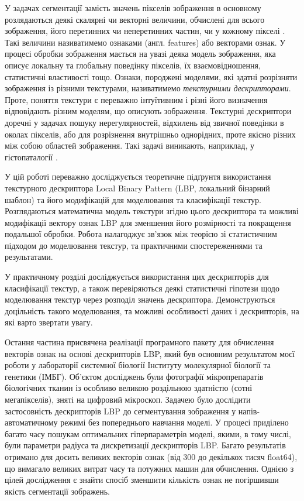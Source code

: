 У задачах сегментації замість значень пікселів зображення в основному розлядаються деякі скалярні чи векторні величини,
обчислені для всього зображення, його перетинних чи неперетинних частин, чи у кожному пікселі \cite{belsare2015, simon2018, esteva2017}. 
Такі величини називатимемо ознаками (англ. features) або векторами ознак.
У процесі обробки зображення мається на увазі деяка модель зображення, яка описує локальну та глобальну поведінку пікселів, їх взаємовідношення, статистичні властивості тощо.
Ознаки, породжені моделями, які здатні розрізняти зображення із різними текстурами, називатимемо \emph{текстурними дескрипторами}.
Проте, поняття текстури є переважно інтуїтивним і різні його визначення відповідають різним моделям, що описують зображення.  
Текстурні дескриптори доречні у задачах пошуку нерегулярностей, відхилень від звичної поведінки в околах пікселів, 
або для розрізнення внутрішньо однорідних, проте якісно різних між собою областей зображення. 
Такі задачі виникають, наприклад, у гістопаталогії \cite{simon2018}.

У цій роботі переважно досліджується теоретичне підґрунтя використання текстурного дескриптора Local Binary Pattern 
(LBP, локальний бінарний шаблон) \cite{ojala2002} та його модифікацій для моделювання та класифікації текстур.
Розглядаються математична модель текстури згідно цього дескриптора та можливі модифікації вектору ознак LBP для зменшення його розмірності та покращення подальшої обробки.
Робота налагоджує зв'язок між теорією зі статистичним підходом до моделювання текстур, та практичними спостереженнями та результатами.

У практичному розділі досліджується використання цих дескрипторів для класифікації текстур, 
а також перевіряються деякі статистичні гіпотези щодо моделювання текстур через розподіл значень дескриптора.
Демонструються доцільність такого моделювання, та можливі особливості даних і дескрипторів, на які варто звертати увагу.

Остання частина присвячена реалізації програмного пакету для обчислення векторів ознак на основі дескрипторів LBP, який був
основним результатом моєї роботи у лабораторії системної біології Інституту молекулярної біології та генетики (ІМБГ).
Об'єктом досліджень були фотографії мікропрепаратів біологічних тканин із особливо великою роздільною здатністю (сотні мегапікселів), зняті на цифровий мікроскоп.
Задачею було дослідити застосовність дескрипторів LBP до сегментування зображення у напів-автоматичному режимі без попереднього навчання моделі.
У процесі приділено багато часу пошукам оптимальних гіперпараметрів моделі, якими, в тому числі, були параметри радіуса та дискретизації дескрипторів LBP.
Багато результатів отримано для досить великих векторів ознак (від 300 до декількох тисяч float64), що вимагало великих витрат часу та потужних машин для обчислення.
Однією з цілей дослідження є знайти спосіб зменшити кількість ознак не погіршивши якість сегментації зображень.


